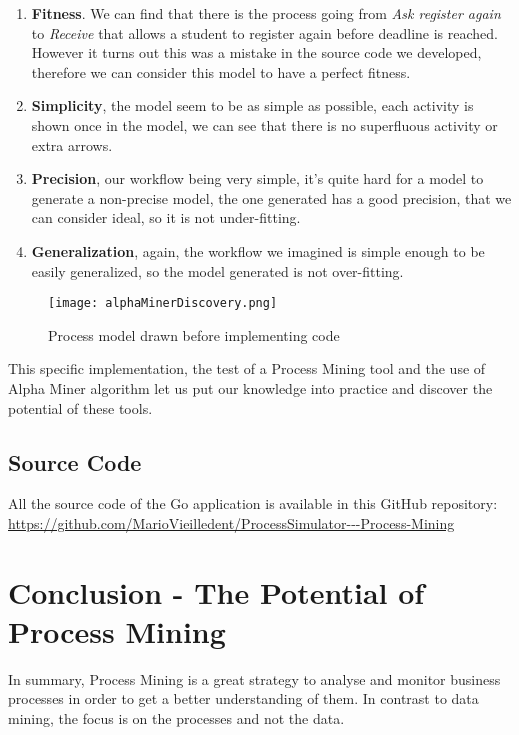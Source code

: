 \documentclass[conference]{IEEEtran}
\begin{document}
\begin{enumerate}
    \item \textbf{Fitness}. We can find that there is the process going from \textit{Ask register again} to \textit{Receive} that allows a student to register again before deadline is reached. However it turns out this was a mistake in the source code we developed, therefore we can consider this model to have a perfect fitness.
    \item \textbf{Simplicity}, the model seem to be as simple as possible, each activity is shown once in the model, we can see that there is no superfluous activity or extra arrows.
    \item \textbf{Precision}, our workflow being very simple, it's quite hard for a model to generate a non-precise model, the one generated has a good precision, that we can consider ideal, so it is not under-fitting.
    \item \textbf{Generalization}, again, the workflow we imagined is simple enough to be easily generalized, so the model generated is not over-fitting.
\end{enumerate}

\begin{figure}[htp]
    \centering
    \texttt{[image: alphaMinerDiscovery.png]}
    \caption{Process model drawn before implementing code}
    \label{fig:alphaMinerDiscovery}
\end{figure}

This specific implementation, the test of a Process Mining tool and the use of Alpha Miner algorithm let us put our knowledge into practice and discover the potential of these tools.

\subsection{Source Code}

All the source code of the Go application is available in this GitHub repository: \url{https://github.com/MarioVieilledent/ProcessSimulator---Process-Mining}

\section{Conclusion - The Potential of Process Mining}

In summary, Process Mining is a great strategy to analyse and monitor business processes in order to get a better understanding of them. In contrast to data mining, the focus is on the processes and not the data.
\end{document}

